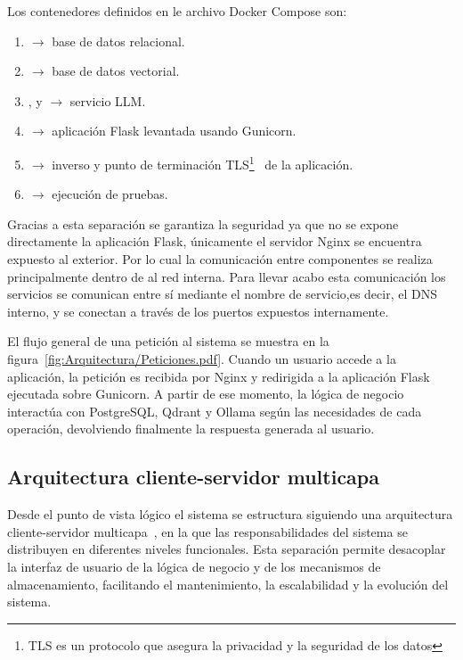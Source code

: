 Los contenedores definidos en le archivo Docker Compose son:
\begin{enumerate}
	\item {} $\to$ base de datos relacional.
	\item {} $\to$ base de datos vectorial.
	\item {},  y  $\to$ servicio LLM.
	\item {} $\to$ aplicación  Flask levantada usando Gunicorn.
	\item {} $\to$  inverso y punto de terminación TLS\footnote{TLS es un protocolo que asegura la privacidad y la seguridad de los datos}~\cite{diseño:TLS} de la aplicación.
	\item {} $\to$ ejecución de pruebas.
\end{enumerate}

Gracias a esta separación se garantiza la seguridad ya que no se expone directamente la aplicación Flask, únicamente el servidor Nginx se encuentra expuesto al exterior. Por lo cual la comunicación entre componentes se realiza principalmente dentro de al red interna. Para llevar acabo esta comunicación los servicios se comunican entre sí mediante el nombre de servicio,es decir, el DNS interno, y se conectan a través de los puertos expuestos internamente.
 
El flujo general de una petición al sistema se muestra en la figura~\ref{fig:Arquitectura/Peticiones.pdf}. Cuando un usuario accede a la aplicación, la petición es recibida por Nginx y redirigida a la aplicación Flask ejecutada sobre Gunicorn. A partir de ese momento, la lógica de negocio interactúa con PostgreSQL, Qdrant y Ollama según las necesidades de cada operación, devolviendo finalmente la respuesta generada al usuario. 
 


\subsection{Arquitectura cliente-servidor multicapa}
Desde el punto de vista lógico el sistema se estructura siguiendo una arquitectura cliente-servidor multicapa~\cite{diseño:tresNiveles}, en la que las responsabilidades del sistema se distribuyen en diferentes niveles funcionales. Esta separación permite desacoplar la interfaz de usuario de la lógica de negocio y de los mecanismos de almacenamiento, facilitando el mantenimiento, la escalabilidad y la evolución del sistema.

